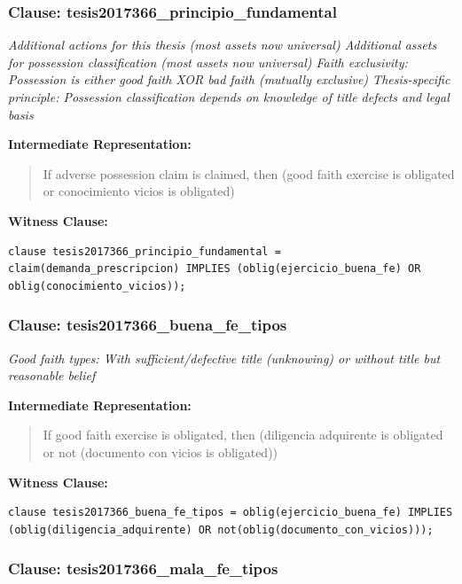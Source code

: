 \documentclass[11pt,a4paper]{article}
\begin{document}
\subsubsection{Clause: tesis2017366\_principio\_fundamental}

\textit{Additional actions for this thesis (most assets now universal) Additional assets for possession classification (most assets now universal) Faith exclusivity: Possession is either good faith XOR bad faith (mutually exclusive) Thesis-specific principle: Possession classification depends on knowledge of title defects and legal basis}

\textbf{Intermediate Representation:}

\begin{quote}
If adverse possession claim is claimed, then (good faith exercise is obligated or conocimiento vicios is obligated)
\end{quote}

\textbf{Witness Clause:}

\begin{lstlisting}[style=witnessstyle, language=Witness]
clause tesis2017366_principio_fundamental = claim(demanda_prescripcion) IMPLIES (oblig(ejercicio_buena_fe) OR oblig(conocimiento_vicios));
\end{lstlisting}

\subsubsection{Clause: tesis2017366\_buena\_fe\_tipos}

\textit{Good faith types: With sufficient/defective title (unknowing) or without title but reasonable belief}

\textbf{Intermediate Representation:}

\begin{quote}
If good faith exercise is obligated, then (diligencia adquirente is obligated or not (documento con vicios is obligated))
\end{quote}

\textbf{Witness Clause:}

\begin{lstlisting}[style=witnessstyle, language=Witness]
clause tesis2017366_buena_fe_tipos = oblig(ejercicio_buena_fe) IMPLIES (oblig(diligencia_adquirente) OR not(oblig(documento_con_vicios)));
\end{lstlisting}

\subsubsection{Clause: tesis2017366\_mala\_fe\_tipos}
\end{document}
